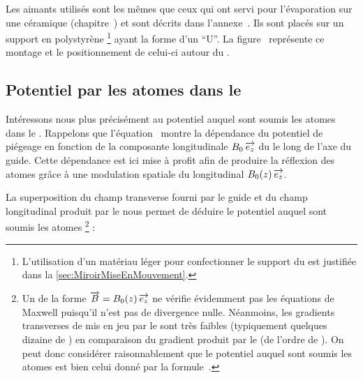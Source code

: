 Les aimants utilisés sont les mêmes que ceux qui ont servi pour l'évaporation sur une céramique (chapitre~) et sont décrits dans l'annexe~.
Ils sont placés sur un support en polystyrène %
\footnote{L'utilisation d'un matériau léger pour confectionner le support du \mimo est justifiée dans la \autoref{sec:MiroirMiseEnMouvement}.} %
ayant la forme d'un \enquote{U}.
La figure~ représente ce montage et le positionnement de celui-ci autour du \gm. 
\bfighs
{}\quad
{}
\label{fig:MiroirMontageAimant}
\efigh


\subsection{Potentiel  par les atomes dans le \gm}\label{sec:MiroirPotentielRessenti}
Intéressons nous plus précisément au potentiel auquel sont soumis les atomes dans le \gm.
Rappelons que l'équation~ montre la dépendance du potentiel de piégeage en fonction de la composante longitudinale $B_0\,\overrightarrow{e_z}$ du \chm le long de l'axe du guide. 
Cette dépendance est ici mise à profit afin de produire la réflexion des atomes grâce à une modulation spatiale du \chm longitudinal ${B_0}(z)\,\overrightarrow{e_z}$.


La superposition du champ transverse fourni par le guide et du champ longitudinal produit par le \mima nous permet de déduire le potentiel auquel sont soumis les atomes%
\footnote{Un \chm de la forme $\overrightarrow{B}={B_0}(z)\,\overrightarrow{e_z}$ ne vérifie évidemment pas les équations de Maxwell puisqu'il n'est pas de divergence nulle. Néanmoins, les gradients transverses de \chm mis en jeu par le \mima sont très faibles (typiquement quelques dizaine de \gausspcm{}) en comparaison du gradient produit par le \gm (de l'ordre de ). On peut donc considérer raisonnablement que le potentiel auquel sont soumis les atomes est bien celui donné par la formule~.}%
:

